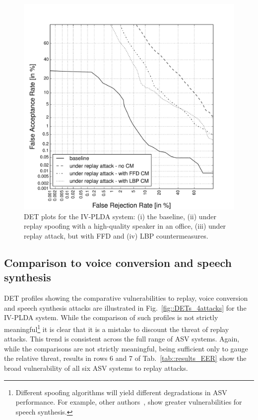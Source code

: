 \begin{figure}[!t]
	\centering
	\includegraphics[width=1\linewidth]{Figs/DET_IVPLDA_counter_Behr.pdf}
	\caption{DET plots for the IV-PLDA system: (i) the baseline, (ii) under replay spoofing with a high-quality speaker in an office, (iii) under replay attack, but with FFD and (iv) LBP countermeasures.}

	\label{fig::DETs_replay_IV}
\end{figure}

\subsection{Comparison to voice conversion and speech synthesis}


DET profiles showing the comparative vulnerabilities to replay, voice conversion and speech synthesis attacks are illustrated in Fig.~\ref{fig::DETs_4attacks} for the IV-PLDA system.  While the comparison of such profiles is not strictly meaningful\footnote{Different spoofing algorithms will yield different degradations in ASV performance.  For example, other authors~\cite{DeLeon2012}, show greater vulnerabilities for speech synthesis.} it is clear that it is a mistake to discount the threat of replay attacks.  This trend is consistent across the full range of ASV systems.  Again, while the comparisons are not strictly meaningful, being sufficient only to gauge the relative threat, results in rows 6 and 7 of Tab.~\ref{tab::results_EER} show the broad vulnerability of all six ASV systems to replay attacks.

